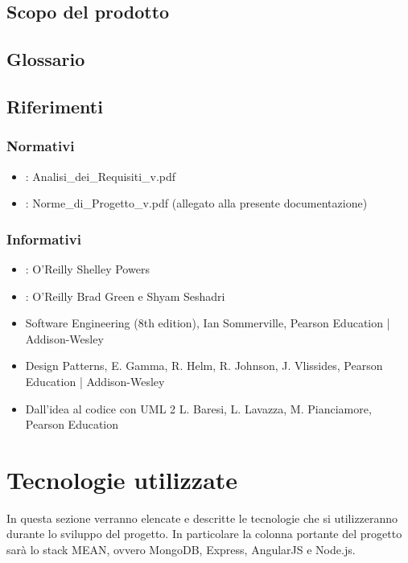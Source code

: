\subsection{Scopo del prodotto}
\Prodotto{}

\subsection{Glossario}
\Glossario{}

\subsection{Riferimenti}

\subsubsection{Normativi}
\begin{itemize}
\item {}: Analisi\_{}dei\_{}Requisiti\_{}v\versioneAnalisiDeiRequisiti{}.pdf
\item {}: Norme\_{}di\_{}Progetto\_{}v\versioneNormeDiProgetto{}.pdf  (allegato alla presente documentazione)\\
\end{itemize}

\subsubsection{Informativi}
\begin{itemize}
\item {}: O'Reilly Shelley Powers
\item {}: O'Reilly Brad Green e Shyam Seshadri
\item Software Engineering (8th edition), Ian Sommerville, Pearson Education | Addison-Wesley
\item Design Patterns, E. Gamma, R. Helm, R. Johnson, J. Vlissides, Pearson Education | Addison-Wesley
\item Dall'idea al codice con UML 2       L. Baresi, L. Lavazza, M. Pianciamore, Pearson Education
\end{itemize}

\newpage
\section{Tecnologie utilizzate}
In questa sezione verranno elencate e descritte le tecnologie che si utilizzeranno durante lo sviluppo del progetto. In particolare la colonna portante del progetto sarà lo stack MEAN, ovvero MongoDB, Express, AngularJS e Node.js.

